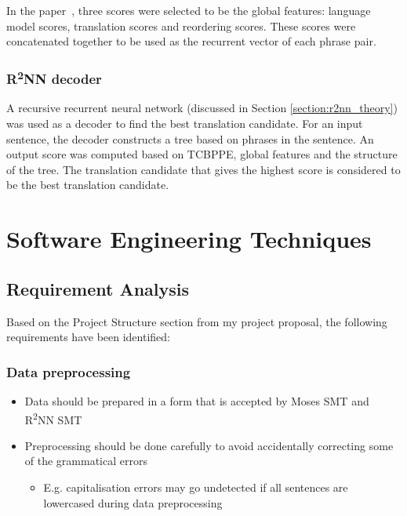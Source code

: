 \documentclass[12pt,a4paper,twoside]{report}
\begin{document}
In the paper~\cite{r2nn}, three scores were selected to be the global features: language model scores, translation scores and reordering scores. These scores were concatenated together to be used as the recurrent vector of each phrase pair.

\subsubsection{R\textsuperscript{2}NN decoder}
A recursive recurrent neural network (discussed in Section \ref{section:r2nn_theory}) was used as a decoder to find the best translation candidate. For an input sentence, the decoder constructs a tree based on phrases in the sentence. An output score was computed based on TCBPPE, global features and the structure of the tree. The translation candidate that gives the highest score is considered to be the best translation candidate.

\section{Software Engineering Techniques}

\subsection{Requirement Analysis}\label{section:requirement}
Based on the Project Structure section from my project proposal, the following requirements have been identified:

\subsubsection{Data preprocessing}
\begin{itemize}
    \item Data should be prepared in a form that is accepted by Moses SMT and R\textsuperscript{2}NN SMT
    \item Preprocessing should be done carefully to avoid accidentally correcting some of the grammatical errors

    \begin{itemize}
        \item E.g. capitalisation errors may go undetected if all sentences are lowercased during data preprocessing
    \end{itemize}
\end{itemize}
\end{document}
